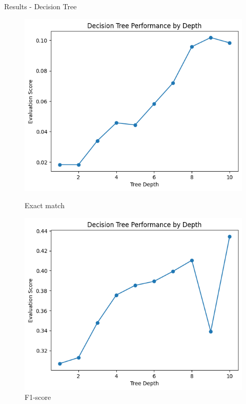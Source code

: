 \documentclass{beamer}
\begin{document}
\begin{frame}[t]{Results - Decision Tree}
\vspace{-3mm}
\begin{figure}[h]
	\centering
	\begin{minipage}{0.3\textwidth}
		\centering
		\includegraphics[width=\linewidth]{images/DecisionTree/exactmatch.png}
		\caption{Exact match}
	\end{minipage}
	\hfill
	\begin{minipage}{0.3\textwidth}
		\centering
		\includegraphics[width=\linewidth]{images/DecisionTree/f1_score.png}
		\caption{F1-score}

\end{minipage}
\end{figure}
\end{frame}
\end{document}
